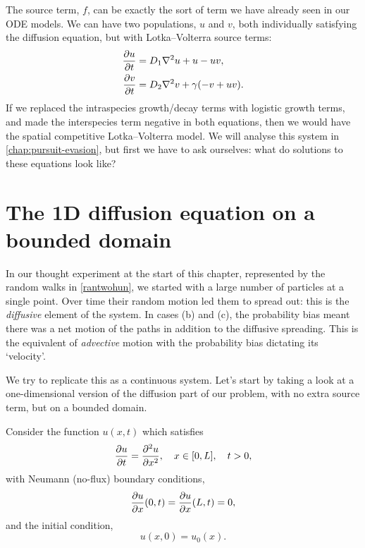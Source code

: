 \documentclass[main.tex]{subfiles}
\begin{document}
The source term, $f$, can be exactly the sort of term we have already seen in our ODE models. We can have two populations, $u$ and $v$, both individually satisfying the diffusion equation, but with Lotka--Volterra source terms:
\begin{subequations}
\label{spatial-lotka-volterra}
\begin{align}
\pd{u}{t} &= D_1 \nabla^2 u + u- uv,\\
 \pd{v}{t} &=  D_2 \nabla^2 v +\gamma(-v+ uv).
\end{align}
\end{subequations}
If we replaced the intraspecies growth/decay terms with logistic growth terms, and made the interspecies term negative in both equations, then we would have the spatial competitive Lotka--Volterra model. We will analyse this system in \cref{chap:pursuit-evasion}, but first we have to ask ourselves: what do solutions to these equations look like? %


\section{The 1D diffusion equation on a bounded domain}\label{sec:sep-variables}
In our thought experiment at the start of this chapter, represented by the random walks in \cref{rantwohun}, we started with a large number of particles at a single point. Over time their random motion led them to spread out: this is the \emph{diffusive} element of the system. In cases (b) and (c), the probability bias meant there was a net motion of the paths in addition to the diffusive spreading. This is the equivalent of \emph{advective} motion with the probability bias dictating its `velocity'.

We try to replicate this as a continuous system. Let's start by taking a look at a one-dimensional version of the diffusion part of our problem, with no extra source term, but on a bounded domain. 

Consider the function $u(x,t)$ which satisfies
\begin{equation}\label{heat_eqn}
    \pd{u}{t} = \pdd{u}{x}, \quad x \in [0,L], \quad t > 0,
\end{equation}
with Neumann (no-flux) boundary conditions,
\begin{equation}\label{BCs}
    \pd{u}{x}(0,t) = \pd{u}{x}(L,t) = 0,
\end{equation}
and the initial condition,
\begin{equation}\label{ICs}
    u(x,0) = u_0(x).
\end{equation}
\end{document}
